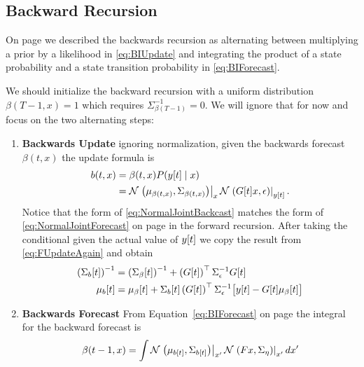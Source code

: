 \subsection{Backward Recursion}
\label{sec:DetailBack}

On page \pageref{eq:BIUpdate} we described the backwards recursion as
alternating between multiplying a prior by a likelihood in
\eqref{eq:BIUpdate} and integrating the product of a state probability
and a state transition probability in \eqref{eq:BIForecast}.

We should initialize the backward recursion with a uniform
distribution $\beta(T-1,x) = 1$ which requires
$\Sigma^{-1}_{\beta(T-1)} = 0$.  We will ignore that for now and focus
on the two alternating steps:
\begin{enumerate}
\item \textbf{Backwards Update} ignoring normalization, given the
  backwards forecast $\beta(t,x)$ the update formula is
  \begin{align}
    \nonumber
    b(t,x) &= \beta(t,x) P(y[t] \mid x) \\
    \label{eq:NormalJointBackcast}
           &= {\mathcal{N}}\left.\left(\mu_{\beta(t,x)},\Sigma_{\beta(t,x)}\right)\right|_{x} {\mathcal{N}}\left.\left(G[t]x,\epsilon\right)\right|_{{y}{[t]}}. 
  \end{align}
  Notice that the form of \eqref{eq:NormalJointBackcast} matches the
  form of \eqref{eq:NormalJointForecast} on page
  \pageref{eq:NormalJointForecast} in the forward recursion.  After
  taking the conditional given the actual value of ${y}{[t]}$ we copy
  the result from \eqref{eq:FUpdateAgain} and obtain
    \begin{align*}
      \left( {\Sigma_b}{[t]} \right)^{-1} &= \left(
        {\Sigma_\beta}{[t]} \right)^{-1} + \left( {G}{[t]}
        \right)^\top \Sigma_\epsilon^{-1} {G}{[t]} \\
      {\mu_b}{[t]} &= {\mu_\beta}{[t]} +
      {\Sigma_{b}}{[t]} \left( {G}{[t]} \right)^\top
      \Sigma_\epsilon^{-1} \big[{y}{[t]} - {G}{[t]}
      {\mu_\beta}{[t]}\big]
    \end{align*}
  \item \textbf{Backwards Forecast} From
    Equation~\eqref{eq:BIForecast} on page \pageref{eq:BIForecast} the
    integral for the backward forecast is
    \begin{equation}
      \label{eq:BackwardKIntrgral}
      \beta(t-1,x) = \int
      \NormalE{\mu_{\ti{b}{t}}}{\Sigma_{\ti{b}{t}}}{x'}
      \NormalE{Fx}{\Sigma_\eta}{x'} dx'

\end{equation}
\end{enumerate}
